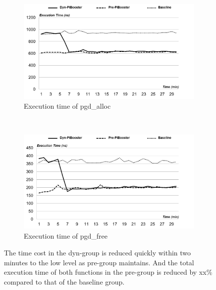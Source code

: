 
\begin{figure}[t!]
    \centering
    \begin{subfigure}[t]{0.5\textwidth}
        \centering
        \includegraphics[height=2.0in]{image/micro/PGDalloc.png}
        \caption{Execution time of pgd\_alloc}
        \label{fig:subfig:a}
    \end{subfigure}%
    ~
    \begin{subfigure}[t]{0.5\textwidth}
        \centering
        \includegraphics[height=2.0in]{image/micro/PGDfree.png}
        \caption{Execution time of pgd\_free}
        \label{fig:subfig:b}
    \end{subfigure}
    \caption{The time cost in the dyn-\name group is reduced quickly within two minutes to the low level as pre-\name group maintains. And the total execution time of both functions in the pre-\name group is reduced by xx\% compared to that of the baseline group.}
    \label{fig:PGDtime}
\end{figure}

